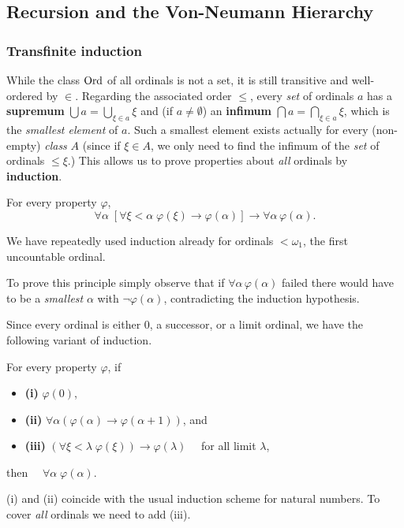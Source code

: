 \subsection{Recursion and the Von-Neumann Hierarchy}

\subsubsection{Transfinite induction}

While the class $\operatorname{Ord}$ of all ordinals is not a set, it is still transitive and well-ordered by $\in$. Regarding the associated order $\leq$, every \textit{set} of ordinals $a$ has a \textbf{supremum} $\bigcup a = \bigcup_{\xi \in a} \xi$ and (if $a \ne \emptyset$) an \textbf{infimum}
$\bigcap a = \bigcap_{\xi \in a} \xi$, which is the \textit{smallest element} of $a$. Such a smallest element exists actually for every (non-empty) \textit{class} $A$ (since if $\xi \in A$, we only need to find the infimum of the \textit{set} of ordinals $\le \xi$.)
This allows us to prove properties about \textit{all} ordinals by \textbf{induction}.

\begin{proposition}\label{prop-induction-ord-i}For every property $\varphi$,
\begin{equation*}
\forall \alpha \; [ \forall \xi < \alpha \; \varphi(\xi) \to \varphi(\alpha)] \to \forall \alpha \, \varphi(\alpha).
\end{equation*}
\end{proposition}We have repeatedly used induction already for ordinals $< \omega_1$, the first uncountable ordinal.

To prove this principle simply observe that if $\forall \alpha \, \varphi(\alpha)$ failed there would have to be a \textit{smallest}  $\alpha$ with  $\neg \varphi(\alpha)$, contradicting the induction hypothesis.

Since every ordinal is either 0, a successor, or a limit ordinal, we have the following variant of induction.

\begin{proposition}\label{prop-induction-ord-ii}For every property $\varphi$, if

\begin{itemize}
\item \textbf{(i)} $\varphi(0)$,
\item \textbf{(ii)} $\forall \alpha (\varphi(\alpha) \to \varphi(\alpha+1))$, and
\item \textbf{(iii)} $(\forall \xi < \lambda \; \varphi(\xi)) \to \varphi(\lambda)\quad$ for all limit $\lambda$,
\end{itemize}

then $\quad \forall \alpha \;  \varphi(\alpha)$.

\end{proposition}(i) and (ii) coincide with the usual induction scheme for natural numbers. To cover \textit{all} ordinals we need to add (iii).


